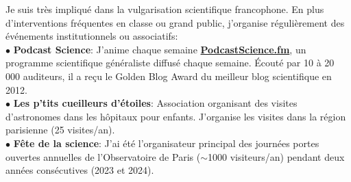 \documentclass[11pt, a4paper, french]{article}
\begin{document}
Je suis très impliqué dans la vulgarisation scientifique francophone. En plus d'interventions fréquentes en classe ou grand public, 
j'organise régulièrement des événements institutionnels ou associatifs:\\ 
$\bullet$ \textbf{Podcast Science}: J'anime chaque semaine \href{http://www.podcastscience.fm}{\textbf{PodcastScience.fm}},
un programme scientifique généraliste diffusé chaque semaine.
Écouté par 10 à 20 000 auditeurs, il a reçu le Golden Blog Award du meilleur blog scientifique en 2012.\\
$\bullet$ \textbf{Les p'tits cueilleurs d'étoiles}: Association organisant des visites d'astronomes dans les hôpitaux pour 
enfants. J'organise les visites dans la région parisienne (25 visites/an).\\
$\bullet$ \textbf{Fête de la science}: J'ai été l'organisateur principal des journées portes ouvertes annuelles 
de l'Observatoire de Paris ($\sim$1000 visiteurs/an) pendant deux années consécutives (2023 et 2024).\\




\end{document}
